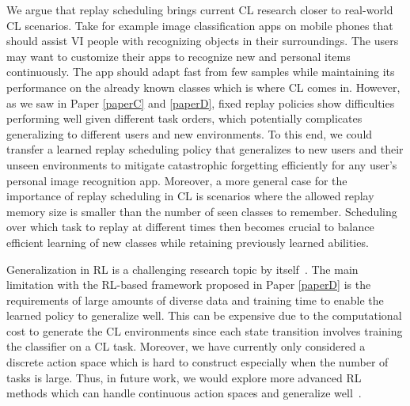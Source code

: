 We argue that replay scheduling brings current CL research closer to real-world CL scenarios. Take for example image classification apps on mobile phones that should assist VI people with recognizing objects in their surroundings. The users may want to customize their apps to recognize new and personal items continuously. The app should adapt fast from few samples while maintaining its performance on the already known classes which is where CL comes in. However, as we saw in Paper \ref{paperC} and \ref{paperD}, fixed replay policies show difficulties performing well given different task orders, which potentially complicates generalizing to different users and new environments. To this end, we could transfer a learned replay scheduling policy that generalizes to new users and their unseen environments to mitigate catastrophic forgetting efficiently for any user's personal image recognition app.  Moreover, a more general case for the importance of replay scheduling in CL is scenarios where the allowed replay memory size is smaller than the number of seen classes to remember. Scheduling over which task to replay at different times then becomes crucial to balance efficient learning of new classes while retaining previously learned abilities. 


Generalization in RL is a challenging research topic by itself~\cite{kirk2021survey,zhang2018dissection,henderson2018deep}. The main limitation with the RL-based framework proposed in Paper \ref{paperD} is the requirements of large amounts of diverse data and training time to enable the learned policy to generalize well. This can be expensive due to the computational cost to generate the CL environments since each state transition involves training the classifier on a CL task. Moreover, we have currently only considered a discrete action space which is hard to construct especially when the number of tasks is large. Thus, in future work, we would explore more advanced RL methods which can handle continuous action spaces and generalize well~\cite{igl2019generalization}.  

